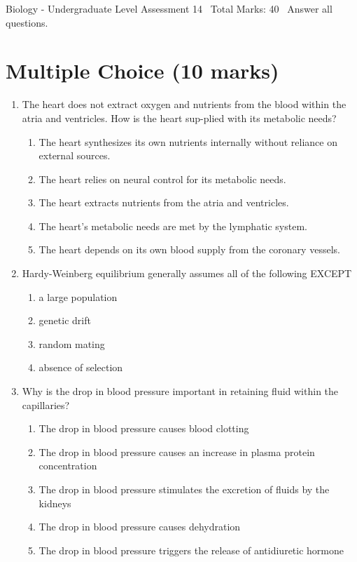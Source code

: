 \documentclass[12pt]{article}
\begin{document}
\begin{center}
Biology - Undergraduate Level Assessment 14 \
Total Marks: 40 \
Answer all questions.
\end{center}

\section*{Multiple Choice (10 marks)}
\begin{enumerate}[label=\arabic*.]
\item The heart does not extract oxygen and nutrients from the blood within the atria and ventricles. How is the heart sup-plied with its metabolic needs?
\begin{enumerate}[label=(\alph*)]
    \item The heart synthesizes its own nutrients internally without reliance on external sources.
    \item The heart relies on neural control for its metabolic needs.
    \item The heart extracts nutrients from the atria and ventricles.
    \item The heart's metabolic needs are met by the lymphatic system.
    \item The heart depends on its own blood supply from the coronary vessels.
\end{enumerate}
\item Hardy-Weinberg equilibrium generally assumes all of the following EXCEPT
\begin{enumerate}[label=(\alph*)]
    \item a large population
    \item genetic drift
    \item random mating
    \item absence of selection
\end{enumerate}
\item Why is the drop in blood pressure important in retaining fluid within the capillaries?
\begin{enumerate}[label=(\alph*)]
    \item The drop in blood pressure causes blood clotting
    \item The drop in blood pressure causes an increase in plasma protein concentration
    \item The drop in blood pressure stimulates the excretion of fluids by the kidneys
    \item The drop in blood pressure causes dehydration
    \item The drop in blood pressure triggers the release of antidiuretic hormone

\end{enumerate}
\end{enumerate}
\end{document}
